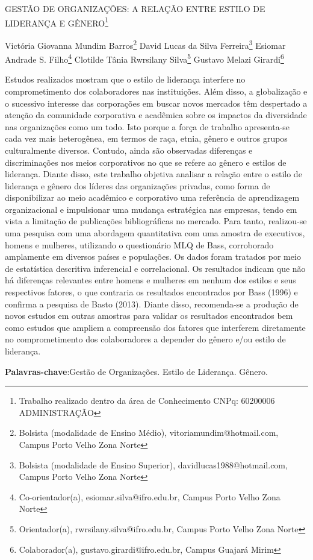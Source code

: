 \documentclass[article,12pt,onesidea,4paper,english,brazil]{abntex2}
\begin{document}
	
	
	\frenchspacing 
	
	\begin{center}
		\LARGE GESTÃO DE ORGANIZAÇÕES: A RELAÇÃO ENTRE ESTILO DE LIDERANÇA E
		GÊNERO\footnote{Trabalho realizado dentro da área de Conhecimento CNPq: 60200006 ADMINISTRAÇÃO}
		
		\normalsize
		Victória Giovanna Mundim Barros\footnote{Bolsista (modalidade de Ensino Médio), vitoriamundim@hotmail.com, Campus Porto Velho Zona
			Norte} 
	   David Lucas da Silva Ferreira\footnote{
	   	Bolsista (modalidade de Ensino Superior), davidlucas1988@hotmail.com, Campus Porto Velho Zona
	   	Norte} 
		Esiomar Andrade S. Filho\footnote{Co-orientador(a), esiomar.silva@ifro.edu.br, Campus Porto Velho Zona Norte} 
		Clotilde Tânia
		Rwrsilany Silva\footnote{ Orientador(a), rwrsilany.silva@ifro.edu.br, Campus Porto Velho Zona Norte}
		Gustavo Melazi Girardi\footnote{Colaborador(a), gustavo.girardi@ifro.edu.br, Campus Guajará Mirim}  
	\end{center}
	
	\noindent Estudos realizados mostram que o estilo de liderança interfere no comprometimento
	dos colaboradores nas instituições. Além disso, a globalização e o sucessivo
	interesse das corporações em buscar novos mercados têm despertado a atenção da
	comunidade corporativa e acadêmica sobre os impactos da diversidade nas
	organizações como um todo. Isto porque a força de trabalho apresenta-se cada vez
	mais heterogênea, em termos de raça, etnia, gênero e outros grupos culturalmente
	diversos. Contudo, ainda são observadas diferenças e discriminações nos meios
	corporativos no que se refere ao gênero e estilos de liderança. Diante disso, este
	trabalho objetiva analisar a relação entre o estilo de liderança e gênero dos líderes
	das organizações privadas, como forma de disponibilizar ao meio acadêmico e
	corporativo uma referência de aprendizagem organizacional e impulsionar uma
	mudança estratégica nas empresas, tendo em vista a limitação de publicações
	bibliográficas no mercado. Para tanto, realizou-se uma pesquisa com uma
	abordagem quantitativa com uma amostra de executivos, homens e mulheres,
	utilizando o questionário MLQ de Bass, corroborado amplamente em diversos países
	e populações. Os dados foram tratados por meio de estatística descritiva inferencial
	e correlacional. Os resultados indicam que não há diferenças relevantes entre
	homens e mulheres em nenhum dos estilos e seus respectivos fatores, o que
	contraria os resultados encontrados por Bass (1996) e confirma a pesquisa de Basto
	(2013). Diante disso, recomenda-se a produção de novos estudos em outras
	amostras para validar os resultados encontrados bem como estudos que ampliem a
	compreensão dos fatores que interferem diretamente no comprometimento dos
	colaboradores a depender do gênero e/ou estilo de liderança.
	
	\vspace{\onelineskip}
	
	\noindent
	\textbf{Palavras-chave}:Gestão de Organizações. Estilo de Liderança. Gênero.
	
\end{document}
